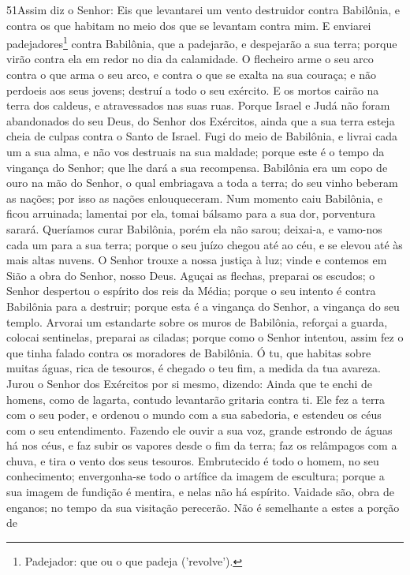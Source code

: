 \lettrine{51} Assim diz o Senhor: Eis que levantarei um vento
destruidor contra Babilônia, e contra os que habitam no meio dos que
se levantam contra mim. E enviarei
padejadores\footnote{Padejador: que ou o que padeja ('revolve').}
contra Babilônia, que a padejarão, e despejarão a sua terra; porque
virão contra ela em redor no dia da calamidade. O flecheiro arme
o seu arco contra o que arma o seu arco, e contra o que se exalta na
sua couraça; e não perdoeis aos seus jovens; destruí a todo o seu
exército. E os mortos cairão na terra dos caldeus, e
atravessados nas suas ruas. Porque Israel e Judá não foram
abandonados do seu Deus, do Senhor dos Exércitos, ainda que a sua
terra esteja cheia de culpas contra o Santo de Israel. Fugi do
meio de Babilônia, e livrai cada um a sua alma, e não vos destruais
na sua maldade; porque este é o tempo da vingança do Senhor; que lhe
dará a sua recompensa. Babilônia era um copo de ouro na mão do
Senhor, o qual embriagava a toda a terra; do seu vinho beberam as
nações; por isso as nações enlouqueceram. Num momento caiu
Babilônia, e ficou arruinada; lamentai por ela, tomai bálsamo para a
sua dor, porventura sarará. Queríamos curar Babilônia, porém ela
não sarou; deixai-a, e vamo-nos cada um para a sua terra; porque o
seu juízo chegou até ao céu, e se elevou até às mais altas nuvens.
O Senhor trouxe a nossa justiça à luz; vinde e contemos em
Sião a obra do Senhor, nosso Deus. Aguçai as flechas,
preparai os escudos; o Senhor despertou o espírito dos reis da
Média; porque o seu intento é contra Babilônia para a destruir;
porque esta é a vingança do Senhor, a vingança do seu templo.
Arvorai um estandarte sobre os muros de Babilônia, reforçai a
guarda, colocai sentinelas, preparai as ciladas; porque como o
Senhor intentou, assim fez o que tinha falado contra os moradores de
Babilônia. Ó tu, que habitas sobre muitas águas, rica de
tesouros, é chegado o teu fim, a medida da tua avareza. Jurou
o Senhor dos Exércitos por si mesmo, dizendo: Ainda que te enchi de
homens, como de lagarta, contudo levantarão gritaria contra ti.
Ele fez a terra com o seu poder, e ordenou o mundo com a sua
sabedoria, e estendeu os céus com o seu entendimento. Fazendo
ele ouvir a sua voz, grande estrondo de águas há nos céus, e faz
subir os vapores desde o fim da terra; faz os relâmpagos com a
chuva, e tira o vento dos seus tesouros. Embrutecido é todo o
homem, no seu conhecimento; envergonha-se todo o artífice da imagem
de escultura; porque a sua imagem de fundição é mentira, e nelas não
há espírito. Vaidade são, obra de enganos; no tempo da sua
visitação perecerão. Não é semelhante a estes a porção de
